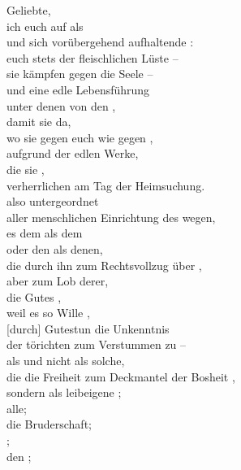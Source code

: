     Geliebte, \\
        ich  euch auf als  \\
        und sich vorübergehend aufhaltende : \\
             euch stets der fleischlichen Lüste – \\
            sie kämpfen gegen die Seele – \\
            und  eine edle Lebensführung \\
            unter denen von den , \\
                damit sie da, \\
                wo sie gegen euch  wie gegen , \\
                aufgrund der edlen Werke, \\
                die sie , \\
                 verherrlichen am Tag der Heimsuchung. \\
             also untergeordnet \\
                aller menschlichen Einrichtung des  wegen, \\
                 es dem  als dem  \\
                oder den  als denen, \\
                    die durch ihn  zum Rechtsvollzug über , \\
                aber zum Lob derer, \\
                    die Gutes , \\
                weil es so  Wille , \\
                    [durch] Gutestun die Unkenntnis \\
                    der törichten  zum Verstummen zu  – \\
                als  und nicht als solche, \\
                    die die Freiheit zum Deckmantel der Bosheit , \\
                sondern als leibeigene ; \\
                     alle; \\
                     die Bruderschaft; \\
                     ; \\
                     den ; \\

